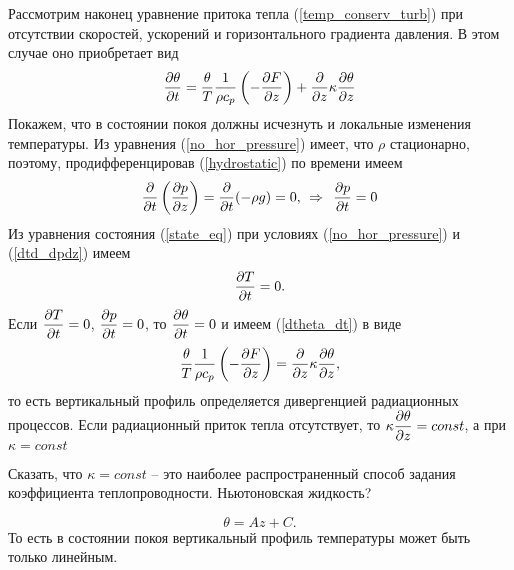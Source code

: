     Рассмотрим наконец уравнение притока тепла (\ref{temp_conserv_turb}) при отсутствии скоростей, ускорений и горизонтального градиента давления. В этом случае оно приобретает вид
   \begin{equation}
    \label{dtheta_dt}
        \displaystyle\frac{\partial \theta}{\partial t} = \frac{\theta}{T}\frac{1}{\rho c_p}\left( -\displaystyle\frac{\partial F}{\partial z} \right)+\frac{\partial}{\partial z}\kappa\displaystyle\frac{\partial \theta}{\partial z} 
    \end{equation}
    Покажем, что в состоянии покоя должны исчезнуть и  локальные изменения температуры. Из уравнения (\ref{no_hor_pressure}) имеет, что $\rho$ стационарно, поэтому, продифференцировав (\ref{hydrostatic}) по времени имеем
    \begin{equation}
    \label{dtd_dpdz}
        \displaystyle\frac{\partial }{\partial t}\left(\displaystyle\frac{\partial p}{\partial z}\right) = \frac{\partial}{\partial t}(-\rho g)=0, \:\: \Rightarrow   \:\:  \displaystyle\frac{\partial p}{\partial t}=0
    \end{equation}
    Из уравнения состояния (\ref{state_eq}) при условиях (\ref{no_hor_pressure}) и (\ref{dtd_dpdz}) имеем
    \begin{equation}
        \displaystyle\frac{\partial T}{\partial t} = 0.
    \end{equation}
    Если $\displaystyle\frac{\partial T}{\partial t} = 0$, $\displaystyle\frac{\partial p}{\partial t} = 0$, то $\displaystyle\frac{\partial \theta}{\partial t} = 0$ и имеем (\ref{dtheta_dt}) в виде
   \begin{equation}
        \frac{\theta}{T}\frac{1}{\rho c_p}\left( -\displaystyle\frac{\partial F}{\partial z} \right)=\frac{\partial}{\partial z}\kappa\displaystyle\frac{\partial \theta}{\partial z}, 
    \end{equation}
    то есть вертикальный профиль определяется дивергенцией радиационных процессов. Если радиационный приток тепла  отсутствует, то $\kappa\displaystyle\frac{\partial \theta}{\partial z}=const$, а при $\kappa=const$ 
\begin{warn}
Сказать, что $\kappa=const$ -- это наиболее распространенный способ задания коэффициента теплопроводности. Ньютоновская жидкость?  
\end{warn}
   \begin{equation}
        \theta = Az+C. 
    \end{equation} 
    То есть в состоянии покоя вертикальный профиль температуры может быть только линейным.


